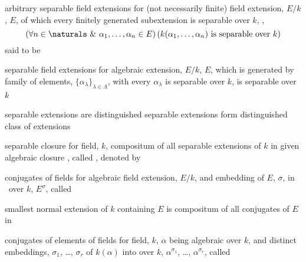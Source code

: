 \documentclass[17pt,landscape]{foils}
\begin{document}
{

\begin{mydefinition}{arbitrary separable field extensions}
	for (not necessarily finite) field extension, $E/k$,
	$E$,
	of which
	every finitely generated subextension
	is separable over $k$,
	\ie,
	$$
		\left(
			\forall n\in\naturals\ \& \ \alpha_1,\ldots, \alpha_n \in E
		\right)
		\left(
			k(\alpha_1, \ldots, \alpha_n)
			\mbox{ is separable over }
			k
		\right)
	$$
	said to be 
\end{mydefinition}

\begin{mytheorem}{separable field extensions}
	for algebraic extension, $E/k$,
	$E$, which is generated by family of elements, $\{\alpha_\lambda\}_{\lambda\in\Lambda}$,
	with every $\alpha_\lambda$ is separable over $k$,
	is separable over $k$\
\end{mytheorem}

\begin{mytheorem}{separable extensions are distinguished}
	separable extensions form distinguished class of extensions
\end{mytheorem}



\begin{mydefinition}{separable closure}
	for field, $k$,
	compositum of all separable extensions of $k$ in given algebraic closure ,
	called \define{separable closure of $k$},
	denoted by 
\end{mydefinition}

\begin{mydefinition}{conjugates of fields}
	for algebraic field extension, $E/k$,
	and embedding of $E$, $\sigma$, in \ over $k$,
	$E^\sigma$,
	called 
\end{mydefinition}

\bit
\item
	smallest normal extension of $k$ containing $E$
	is compositum of all conjugates of $E$ in \algclosure{E}\
\eit

\begin{mydefinition}{conjugates of elements of fields}
	for field, $k$,
	$\alpha$ being algebraic over $k$,
	and
	distinct embeddings, $\sigma_1$, \ldots, $\sigma_r$ of $k(\alpha)$ into  over $k$,
	$\alpha^{\sigma_1}$,
	\ldots,
	$\alpha^{\sigma_r}$,
	called 
\end{mydefinition}

}
\end{document}
